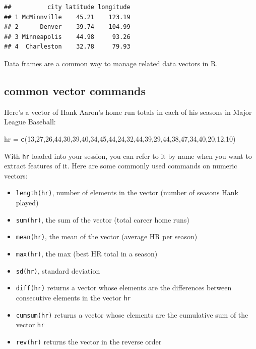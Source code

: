 \documentclass[
]{book}
\newenvironment{Shaded}{\begin{snugshade}}{\end{snugshade}}
\newcommand{\DecValTok}[1]{\textcolor[rgb]{0.00,0.00,0.81}{#1}}
\newcommand{\FunctionTok}[1]{\textcolor[rgb]{0.13,0.29,0.53}{\textbf{#1}}}
\newcommand{\NormalTok}[1]{#1}
\newcommand{\OtherTok}[1]{\textcolor[rgb]{0.56,0.35,0.01}{#1}}
\providecommand{\tightlist}{%
  \setlength{\itemsep}{0pt}\setlength{\parskip}{0pt}}
\theoremstyle{definition}
\theoremstyle{definition}
\theoremstyle{definition}
\theoremstyle{definition}
\theoremstyle{remark}
\begin{document}
\begin{verbatim}
##          city latitude longitude
## 1 McMinnville    45.21    123.19
## 2      Denver    39.74    104.99
## 3 Minneapolis    44.98     93.26
## 4  Charleston    32.78     79.93
\end{verbatim}

Data frames are a common way to manage related data vectors in R.

\subsection*{common vector commands}\label{common-vector-commands}

Here's a vector of Hank Aaron's home run totals in each of his seasons in Major League Baseball:

\begin{Shaded}
\begin{Highlighting}[]
\NormalTok{hr }\OtherTok{=} \FunctionTok{c}\NormalTok{(}\DecValTok{13}\NormalTok{,}\DecValTok{27}\NormalTok{,}\DecValTok{26}\NormalTok{,}\DecValTok{44}\NormalTok{,}\DecValTok{30}\NormalTok{,}\DecValTok{39}\NormalTok{,}\DecValTok{40}\NormalTok{,}\DecValTok{34}\NormalTok{,}\DecValTok{45}\NormalTok{,}\DecValTok{44}\NormalTok{,}\DecValTok{24}\NormalTok{,}\DecValTok{32}\NormalTok{,}\DecValTok{44}\NormalTok{,}\DecValTok{39}\NormalTok{,}\DecValTok{29}\NormalTok{,}\DecValTok{44}\NormalTok{,}\DecValTok{38}\NormalTok{,}\DecValTok{47}\NormalTok{,}\DecValTok{34}\NormalTok{,}\DecValTok{40}\NormalTok{,}\DecValTok{20}\NormalTok{,}\DecValTok{12}\NormalTok{,}\DecValTok{10}\NormalTok{)}
\end{Highlighting}
\end{Shaded}

With \texttt{hr} loaded into your session, you can refer to it by name when you want to extract features of it. Here are some commonly used commands on numeric vectors:

\begin{itemize}
\tightlist
\item
  \texttt{length(hr)}, number of elements in the vector (number of seasons Hank played)
\item
  \texttt{sum(hr)}, the sum of the vector (total career home runs)
\item
  \texttt{mean(hr)}, the mean of the vector (average HR per season)
\item
  \texttt{max(hr)}, the max (best HR total in a season)
\item
  \texttt{sd(hr)}, standard deviation
\item
  \texttt{diff(hr)} returns a vector whose elements are the differences between consecutive elements in the vector \texttt{hr}
\item
  \texttt{cumsum(hr)} returns a vector whose elements are the cumulative sum of the vector \texttt{hr}
\item
  \texttt{rev(hr)} returns the vector in the reverse order
\end{itemize}
\end{document}
